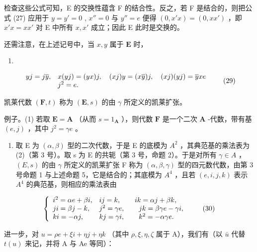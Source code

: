 检查这些公式可知，E 的交换性蕴含 F 的结合性。反之，若 F 是结合的，则把公式 (27) 应用于 \(y = y' = 0\) , \(x'' = 0\) 与 \(y'' = e\) 便得 \((0, x'x) = (0, xx')\) ，即 \(x'x = xx'\) 对 E 中所有 \(x, x'\) 成立；因此 E 此时是交换的。

还需注意，在上述记号中，当 \(x, y\) 属于 \(\mathbf{E}\) 时，

\begin{enumerate}
\def\labelenumi{(\arabic{enumi})}
\setcounter{enumi}{27}
\tightlist
\item
\end{enumerate}

\[
\begin{array}{r l} y j = j \overline {{y}}, & x (y j) = (y x) j, \quad (x j) y = (x \overline {{y}}) j, \quad (x j) (y j) = \overline {{y}} x e \\ & j ^ {2} = e. \end{array}\tag{29}
\]

凯莱代数 \((\mathbf{F}, t)\) 称为 \((\mathbf{E}, s)\) 的由 \(\gamma\) 所定义的凯莱扩张。

例子。(1) 若取 \(\mathbf{E} = \mathbf{A}\) （从而 \(s = 1_{\mathbf{A}}\) ），则代数 \(\mathbf{F}\) 是一个二次 \(\mathbf{A}\) -代数，带有基 \((e,j)\) ，其中 \(j^2 = \gamma e\) 。

\begin{enumerate}
\def\labelenumi{(\arabic{enumi})}
\setcounter{enumi}{1}
\tightlist
\item
  取 E 为 \((\alpha, \beta)\) 型的二次代数，于是 E 的底模为 \(A^{2}\) ，其典范基的乘法表为 (2)（第 3 号）。取 s 为 E 的共轭（第 3 号，命题 2）。于是对所有 \(\gamma \in A\) ， \((E, s)\) 的由 \(\gamma\) 所定义的凯莱扩张 F 称为 \((\alpha, \beta, \gamma)\) 型的四元数代数，由第 3 号命题 1 与上述命题 5，它是结合的；其底模为 \(A^{4}\) ，且若 \((e, i, j, k)\) 表示 \(A^{4}\) 的典范基，则相应的乘法表由
\end{enumerate}

\[
\left\{ \begin{array}{l l} i ^ {2} = \alpha e + \beta i, & i j = k, \qquad i k = \alpha j + \beta k, \\ j i = \beta j - k, & j ^ {2} = \gamma e, \qquad j k = \beta \gamma e - \gamma i, \\ k i = - \alpha j, & k j = \gamma i, \qquad k ^ {2} = - \alpha \gamma e. \end{array} \right.\tag{30}
\]

进一步，对 \(u = \rho e + \xi i + \eta j + \eta k\) （其中 \(\rho, \xi, \eta, \zeta\) 属于 A），我们有（以 \(\bar{u}\) 代替 \(t(u)\) 来记，并将 A 与 Ae 等同）：

